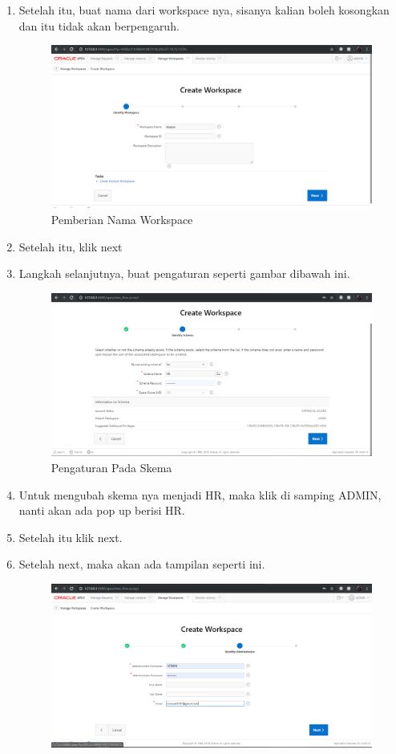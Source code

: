 \documentclass{article}
\begin{document}
\begin{enumerate}
\newpage
    \item Setelah itu, buat nama dari workspace nya, sisanya kalian boleh kosongkan dan itu tidak akan berpengaruh.
    \begin{figure}[!htbp]
        \centering
        \includegraphics[scale=0.3]{LangkahKetiga.PNG}
        \caption{Pemberian Nama Workspace}
    \end{figure}
    \item Setelah itu, klik next
    \item Langkah selanjutnya, buat pengaturan seperti gambar dibawah ini.
    \begin{figure}[!htbp]
        \centering
        \includegraphics[scale=0.3]{LangkahKeempat.PNG}
        \caption{Pengaturan Pada Skema}
    \end{figure}
    \item Untuk mengubah skema nya menjadi HR, maka klik di samping ADMIN, nanti akan ada pop up berisi HR.
\newpage
    \item Setelah itu klik next.
    \item Setelah next, maka akan ada tampilan seperti ini.
    \begin{figure}[!htbp]
        \centering
        \includegraphics[scale=0.3]{LangkahKelima.PNG}

\end{figure}
\end{enumerate}
\end{document}
